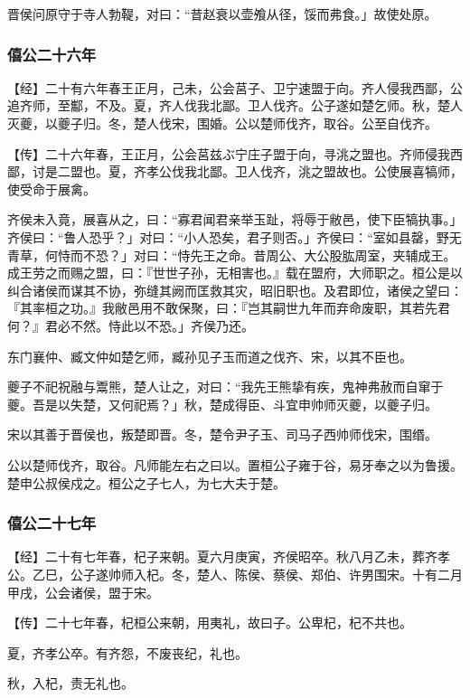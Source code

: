\documentclass[]{article}
\begin{document}
晋侯问原守于寺人勃鞮，对曰：``昔赵衰以壶飧从径，馁而弗食。」故使处原。

\hypertarget{header-n941}{%
\subsubsection{僖公二十六年}\label{header-n941}}

【经】二十有六年春王正月，己未，公会莒子、卫宁速盟于向。齐人侵我西鄙，公追齐师，至酅，不及。夏，齐人伐我北鄙。卫人伐齐。公子遂如楚乞师。秋，楚人灭夔，以夔子归。冬，楚人伐宋，围婚。公以楚师伐齐，取谷。公至自伐齐。

【传】二十六年春，王正月，公会莒兹ぶ宁庄子盟于向，寻洮之盟也。齐师侵我西鄙，讨是二盟也。夏，齐孝公伐我北鄙。卫人伐齐，洮之盟故也。公使展喜犒师，使受命于展禽。

齐侯未入竟，展喜从之，曰：``寡君闻君亲举玉趾，将辱于敝邑，使下臣犒执事。」齐侯曰：``鲁人恐乎？」对曰：``小人恐矣，君子则否。」齐侯曰：``室如县罄，野无青草，何恃而不恐？」对曰：``恃先王之命。昔周公、大公股肱周室，夹辅成王。成王劳之而赐之盟，曰：『世世子孙，无相害也。』载在盟府，大师职之。桓公是以纠合诸侯而谋其不协，弥缝其阙而匡救其灾，昭旧职也。及君即位，诸侯之望曰：『其率桓之功。』我敝邑用不敢保聚，曰：『岂其嗣世九年而弃命废职，其若先君何？』君必不然。恃此以不恐。」齐侯乃还。

东门襄仲、臧文仲如楚乞师，臧孙见子玉而道之伐齐、宋，以其不臣也。

夔子不祀祝融与鬻熊，楚人让之，对曰：``我先王熊挚有疾，鬼神弗赦而自窜于夔。吾是以失楚，又何祀焉？」秋，楚成得臣、斗宜申帅师灭夔，以夔子归。

宋以其善于晋侯也，叛楚即晋。冬，楚令尹子玉、司马子西帅师伐宋，围缗。

公以楚师伐齐，取谷。凡师能左右之曰以。置桓公子雍于谷，易牙奉之以为鲁援。楚申公叔侯戍之。桓公之子七人，为七大夫于楚。

\hypertarget{header-n951}{%
\subsubsection{僖公二十七年}\label{header-n951}}

【经】二十有七年春，杞子来朝。夏六月庚寅，齐侯昭卒。秋八月乙未，葬齐孝公。乙巳，公子遂帅师入杞。冬，楚人、陈侯、蔡侯、郑伯、许男围宋。十有二月甲戌，公会诸侯，盟于宋。

【传】二十七年春，杞桓公来朝，用夷礼，故曰子。公卑杞，杞不共也。

夏，齐孝公卒。有齐怨，不废丧纪，礼也。

秋，入杞，责无礼也。
\end{document}
